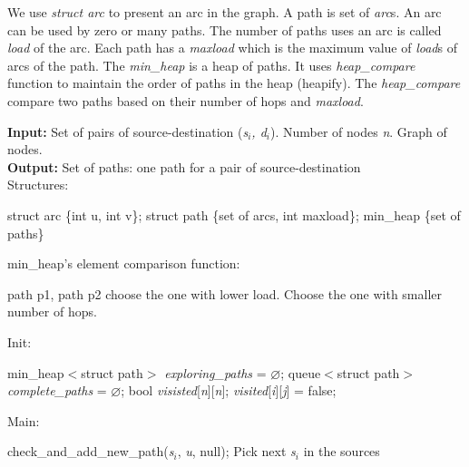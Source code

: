 We use \textit{struct arc} to present an arc in the graph. A path is set of \textit{arc}s. An arc can be used by zero or many paths. The number of paths uses an arc is called \textit{load} of the arc. Each path has a \textit{maxload} which is the maximum value of \textit{load}s of arcs of the path. The \textit{min\_heap} is a heap of paths. It uses \textit{heap\_compare} function to maintain the order of paths in the heap (heapify). The \textit{heap\_compare} compare two paths based on their number of hops and \textit{maxload}.

\begin{algorithm}[!htp]
\textbf{Input:} Set of pairs of source-destination (\textit{s$_i$, d$_i$}). Number of nodes \textit{n}. Graph of nodes. \\
\textbf{Output:} Set of paths: one path for a pair of source-destination \\

Structures:
    \begin{algorithmic}
        \State struct arc \{int u, int v\};
        \State struct path \{set of arcs, int maxload\};
        \State min\_heap \{set of paths\}
    \end{algorithmic}

min\_heap's element comparison function:
    \begin{algorithmic}
         {path p1, path p2}
                \State choose the one with lower load.
                \State Choose the one with smaller number of hops.
            \EndIf
        \EndFunction
    \end{algorithmic}

Init:
    \begin{algorithmic}
	\State min\_heap$<$struct path$>$ \textit{exploring\_paths} = $\varnothing$;
	\State queue$<$struct path$>$ \textit{complete\_paths} = $\varnothing$;
	\State bool \textit{visisted}[\textit{n}][\textit{n}];
	    \State \textit{visited}[{\it i}][{\it j}] = false;
	\EndFor
    \end{algorithmic}
Main:

\begin{algorithmic}

	\State check\_and\_add\_new\_path({\it s}$_i$, \textit{u}, null);
	\State Pick next \textit{s$_i$} in the sources
    \EndWhile


\end{algorithmic}
\end{algorithm}

